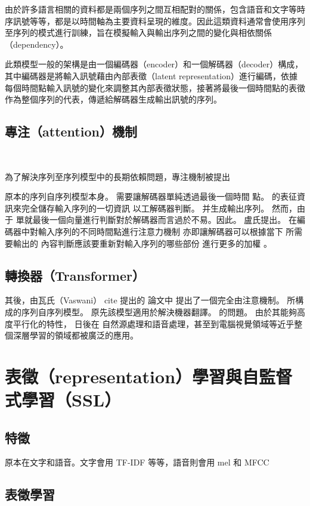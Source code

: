 由於許多語言相關的資料都是兩個序列之間互相配對的關係，包含語音和文字等時序訊號等等，都是以時間軸為主要資料呈現的維度。因此這類資料通常會使用序列至序列的模式進行訓練，旨在模擬輸入與輸出序列之間的變化與相依關係（dependency）。

此類模型一般的架構是由一個編碼器（encoder）和一個解碼器（decoder）構成，其中編碼器是將輸入訊號藉由內部表徵（latent representation）進行編碼，依據每個時間點輸入訊號的變化來調整其內部表徵狀態，接著將最後一個時間點的表徵作為整個序列的代表，傳遞給解碼器生成輸出訊號的序列。

\subsection{專注（attention）機制}　　

為了解決序列至序列模型中的長期依賴問題，專注機制被提出


原本的序列自序列模型本身。 需要讓解碼器單純透過最後一個時間 點。 的表征資訊來完全儲存輸入序列的一切資訊 以工解碼器判斷。 并生成輸出序列。 然而，由于 單就最後一個向量進行判斷對於解碼器而言過於不易。因此。 盧氏提出。 在編碼器中對輸入序列的不同時間點進行注意力機制 亦即讓解碼器可以根據當下 所需要輸出的 內容判斷應該要重新對輸入序列的哪些部份 進行更多的加權 。

\subsection{轉換器（Transformer）}

其後，由瓦氏（Vaswani） cite 提出的 論文中 提出了一個完全由注意機制。 所構成的序列自序列模型。 原先該模型適用於解決機器翻譯。 的問題。
由於其能夠高度平行化的特性， 日後在 自然源處理和語音處理，甚至到電腦視覺領域等近乎整個深層學習的領域都被廣泛的應用。



\section{表徵（representation）學習與自監督式學習（SSL）}

\subsection{特徵}

原本在文字和語音。文字會用 TF-IDF 等等，語音則會用 mel 和 MFCC

\subsection{表徵學習}

